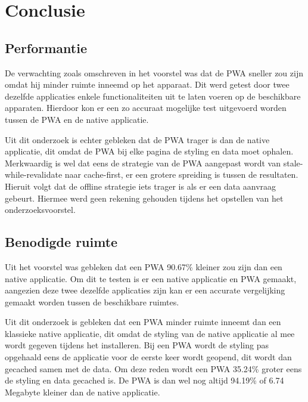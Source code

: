 
\chapter{Conclusie}
\label{ch:conclusie}

\section{Performantie}
De verwachting zoals omschreven in het voorstel was dat de PWA sneller zou zijn omdat hij minder ruimte inneemd op het apparaat. Dit werd getest door twee dezelfde applicaties enkele functionaliteiten uit te laten voeren op de beschikbare apparaten. Hierdoor kon er een zo accuraat mogelijke test uitgevoerd worden tussen de PWA en de native applicatie.

Uit dit onderzoek is echter gebleken dat de PWA trager is dan de native applicatie, dit omdat de PWA bij elke pagina de styling en data moet ophalen. Merkwaardig is wel dat eens de strategie van de PWA aangepast wordt van stale-while-revalidate naar cache-first, er een grotere spreiding is tussen de resultaten. Hieruit volgt dat de offline strategie iets trager is als er een data aanvraag gebeurt. Hiermee werd geen rekening gehouden tijdens het opstellen van het onderzoeksvoorstel.

\section{Benodigde ruimte}
Uit het voorstel was gebleken dat een PWA 90.67\% kleiner zou zijn dan een native applicatie. Om dit te testen is er een native applicatie en PWA gemaakt, aangezien deze twee dezelfde applicaties zijn kan er een accurate vergelijking gemaakt worden tussen de beschikbare ruimtes. 

Uit dit onderzoek is gebleken dat een PWA minder ruimte inneemt dan een klassieke native applicatie, dit omdat de styling van de native applicatie al mee wordt gegeven tijdens het installeren. Bij een PWA wordt de styling pas opgehaald eens de applicatie voor de eerste keer wordt geopend, dit wordt dan gecached samen met de data. Om deze reden wordt een PWA 35.24\% groter eens de styling en data gecached is. De PWA is dan wel nog altijd 94.19\% of 6.74 Megabyte kleiner dan de native applicatie.


